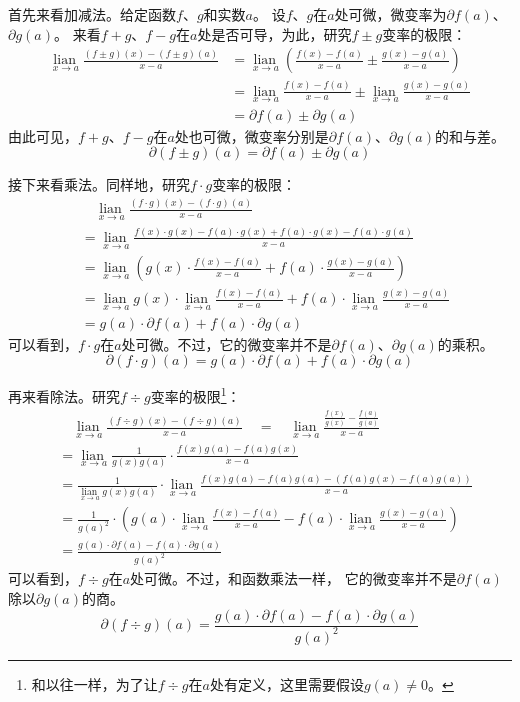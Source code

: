 \documentclass[12pt,UTF8]{ctexbook}
\newcommand{\lian}[1]{
    \underset{#1}{\operatorname{lian}\,}
}
\theoremstyle{definition}
\theoremstyle{plain}
\begin{document}
首先来看加减法。给定函数$f$、$g$和实数$a$。
设$f$、$g$在$a$处可微，微变率为$\partial f(a)$、$\partial g(a)$。
来看$f+g$、$f-g$在$a$处是否可导，为此，研究$f \pm g$变率的极限：
\begin{align*}
    \lian{x\to a} \frac{(f \pm g)(x) - (f \pm g)(a)}{x - a} &= \lian{x\to a} \left(\frac{f(x) - f(a)}{x - a} \pm \frac{g(x) - g(a)}{x - a}\right)  \\
    &= \lian{x\to a} \frac{f(x) - f(a)}{x - a} \pm \lian{x\to a} \frac{g(x) - g(a)}{x - a}  \\
    &= \partial f(a) \pm \partial g(a) 
\end{align*}
由此可见，$f+g$、$f-g$在$a$处也可微，微变率分别是$\partial f(a)$、$\partial g(a)$的和与差。
$$ \partial (f \pm g)(a) = \partial f(a) \pm \partial g(a) $$

接下来看乘法。同样地，研究$f \cdot g$变率的极限：
\begin{align*}
    & \quad \lian{x\to a} \frac{(f \cdot g)(x) - (f \cdot g)(a)}{x - a}  \\
    &=  \lian{x\to a} \frac{f(x)\cdot g(x) - f(a)\cdot g(x) + f(a)\cdot g(x) - f(a)\cdot g(a)}{x - a}  \\
    &= \lian{x\to a} \left(g(x)\cdot\frac{f(x) - f(a)}{x - a} + f(a)\cdot\frac{g(x) - g(a)}{x - a}\right)  \\
    &= \lian{x\to a} g(x) \cdot \lian{x\to a}\frac{f(x) - f(a)}{x - a} + f(a)\cdot \lian{x\to a} \frac{g(x) - g(a)}{x - a}  \\
    &= g(a)\cdot\partial f(a) + f(a) \cdot\partial g(a) 
\end{align*}
可以看到，$f \cdot g$在$a$处可微。不过，它的微变率并不是$\partial f(a)$、$\partial g(a)$的乘积。
$$ \partial (f \cdot g)(a) = g(a)\cdot\partial f(a) + f(a) \cdot\partial g(a) $$

再来看除法。研究$f \div g$变率的极限\footnote{和以往一样，为了让$f \div g$在$a$处有定义，这里需要假设$g(a)\neq 0$。}：
\begin{align*}
    & \quad \lian{x\to a} \frac{(f \div g)(x) - (f \div g)(a)}{x - a} \quad = \quad \lian{x\to a} \frac{\frac{f(x)}{g(x)} - \frac{f(a)}{g(a)}}{x - a}  \\
    &= \lian{x\to a} \frac{1}{g(x)g(a)}\cdot\frac{f(x) g(a) - f(a) g(x)}{x - a}  \\
    &= \frac{1}{\lian{x\to a}g(x)g(a)} \cdot \lian{x\to a} \frac{f(x) g(a) - f(a) g(a) - (f(a) g(x) - f(a) g(a))}{x - a}  \\
    &= \frac{1}{g(a)^2}\cdot \left( g(a)\cdot \lian{x\to a} \frac{f(x) - f(a)}{x - a} - f(a) \cdot\lian{x\to a} \frac{g(x) - g(a)}{x - a}\right)  \\
    &= \frac{g(a)\cdot \partial f(a) - f(a)\cdot \partial g(a)}{g(a)^2} 
\end{align*}
可以看到，$f \div g$在$a$处可微。不过，和函数乘法一样，
它的微变率并不是$\partial f(a)$除以$\partial g(a)$的商。
$$ \partial (f \div g)(a) = \frac{g(a)\cdot \partial f(a) - f(a)\cdot \partial g(a)}{g(a)^2} $$
\end{document}
